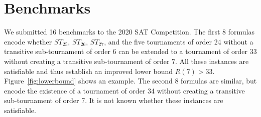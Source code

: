 \documentclass[conference]{IEEEtran}
\begin{document}
\section*{Benchmarks}

We submitted 16 benchmarks to the 2020 SAT Competition. The first
8 formulas encode whether $ST_{25}$, $ST_{26}$, $ST_{27}$, and the five
tournaments of order 24 without a transitive sub-tournament of order 6
can be extended to a tournament of order 33 without creating a
transitive sub-tournament of order 7. All these instances are satisfiable
and thus establish an improved lower bound $R(7) > 33$. Figure~\ref{fig:lowerbound} shows an example. The second 8
formulas are similar, but encode the existence of a tournament of order 34
without creating a transitive sub-tournament of order 7. It is not known 
whether these instances are satisfiable.


\newcommand*\circled[1]{\tikz[baseline=(char.base)]{
            \node[fill=black,shape=circle,draw,inner sep=1pt] (char) {\textcolor{white}{#1}};}}

\newcommand{\zero}{0}
\newcommand{\one}{\circled{1}}
\end{document}
